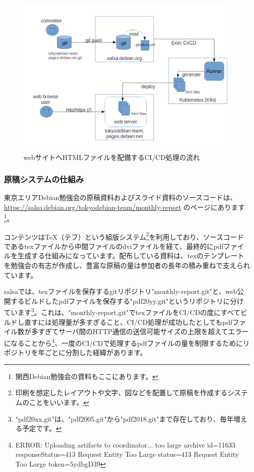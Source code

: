 \documentclass[mingoth,a4paper]{jsarticle}
\begin{document}
\begin{figure}[H]
\begin{center}
  \includegraphics[width=12cm]{image201806/gitflow_web.png}
  \caption{webサイトへHTMLファイルを配備するCI/CD処理の流れ}
  \label{fig:deploy-html-CICD}
\end{center}
\end{figure}


\subsubsection{原稿システムの仕組み}

東京エリアDebian勉強会の原稿資料およびスライド資料のソースコードは、\url{https://salsa.debian.org/tokyodebian-team/monthly-report} のページにあります\footnote{関西Debian勉強会の資料もここにあります。}。


コンテンツはTeX（テフ）という組版システム\footnote{印刷を想定したレイアウトや文字、図などを配置して原稿を作成するシステムのことをいいます。}を利用しており、ソースコードであるtexファイルから中間ファイルのdviファイルを経て、最終的にpdfファイルを生成する仕組みになっています。配布している資料は、texのテンプレートを勉強会の有志が作成し、豊富な原稿の量は参加者の長年の積み重ねで支えられています。


salsaでは、texファイルを保存するgitリポジトリ"monthly-report.git"と、web公開するビルドしたpdfファイルを保存する"pdf20yy.git"というリポジトリに分けています\footnote{"pdf20xx.git"は、"pdf2005.git"から"pdf2018.git"まで存在しており、毎年増える予定です。}。これは、"monthly-report.git"でtexファイルをCI/CDの度にすべてビルドし直すには処理量が多すぎること、CI/CD処理が成功したとしてもpdfファイル数が多すぎてサーバ間のHTTP通信の送信可能サイズの上限を超えてエラーになることから\footnote{ERROR: Uploading artifacts to coordinator... too large archive id=11633 responseStatus=413 Request Entity Too Large status=413 Request Entity Too Large token=5ydbgD39}、一度のCI/CDで処理するpdfファイルの量を制限するためにリポジトリを年ごとに分割した経緯があります。
\end{document}
